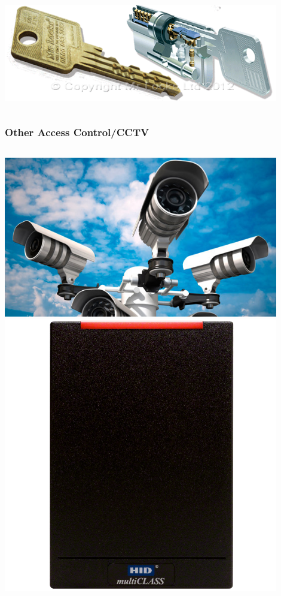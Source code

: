 \documentclass[]{beamer}
\begin{document}
\begin{frame}
\begin{columns}[c]
    \includegraphics[width=0.9\textwidth]{high-sec-lock}
  \end{columns}

\end{frame}

\begin{frame}
  \frametitle{Other Access Control/CCTV}
  \begin{columns}
    \includegraphics[width=0.9\textwidth]{cctv}
    \includegraphics[width=0.9\textwidth]{hid-reader}
  \end{columns}
\end{frame}
\end{document}
